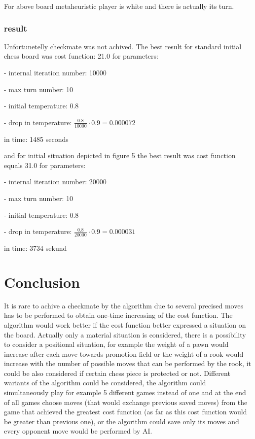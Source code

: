 \documentclass[pdftex]{article}
\begin{document}
For above board metaheuristic player is white and there is actually its turn.
 
\subsubsection{result}
Unfortunetelly checkmate was not achived. The best result for standard initial chess board was cost function: 21.0 for parameters:

- internal iteration number: 10000

- max turn number: 10

- initial temperature: 0.8

- drop in temperature: $\frac{0.8}{10000} \cdot 0.9 = 0.000072$

in time: 1485 seconds

and for initial situation depicted in figure 5 the best result was cost function equals 31.0 for parameters:

- internal iteration number: 20000

- max turn number: 10

- initial temperature: 0.8

- drop in temperature: $\frac{0.8}{20000} \cdot 0.9 = 0.000031$

in time: 3734 sekund
\section{Conclusion}
\label{sec:conclusion}

It is rare to achive a checkmate by the algorithm due to several precised moves has to be performed to obtain one-time increasing of the cost function. The algorithm would work better if the cost function better expressed a situation on the board. Actually only a material situation is considered, there is a possibility to consider a positional situation, for example the weight of a pawn would increase after each move towards promotion field or the weight of a rook would increase with the number of possible moves that can be performed by the rook, it could be also considered if certain chess piece is protected or not. Different wariants of the algorithm could be considered, the algorithm could simultaneously play for example 5 different games instead of one and at the end of all games choose moves (that would exchange previous saved moves) from the game that achieved the greatest cost function (as far as this cost function would be greater than previous one), or the algorithm could save only its moves and every opponent move would be performed by AI.
\end{document}
